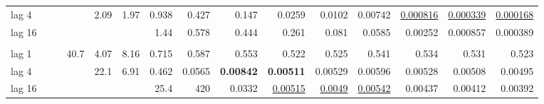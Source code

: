 \begin{table}[t]
\begin{tabular}{lrrrrrrrrrrrrrr}
\quad lag 4 &  &  &  & 2.09 & 1.97 & 0.938 & 0.427 & 0.147 & 0.0259 & 0.0102 & 0.00742 & \underline{0.000816} & \underline{0.000339} & \underline{0.000168} \\
\quad lag 16 &  &  &  &  &  & 1.44 & 0.578 & 0.444 & 0.261 & 0.081 & 0.0585 & 0.00252 & 0.000857 & 0.000389 \\
\addlinespace
\multicolumn{15}{l}{\textit{VARX}} \\
\quad lag 1 &  &  & 40.7 & 4.07 & 8.16 & 0.715 & 0.587 & 0.553 & 0.522 & 0.525 & 0.541 & 0.534 & 0.531 & 0.523 \\
\quad lag 4 &  &  &  & 22.1 & 6.91 & 0.462 & 0.0565 & \textbf{0.00842} & \textbf{0.00511} & 0.00529 & 0.00596 & 0.00528 & 0.00508 & 0.00495 \\
\quad lag 16 &  &  &  &  &  & 25.4 & 420 & 0.0332 & \underline{0.00515} & \underline{0.0049} & \underline{0.00542} & 0.00437 & 0.00412 & 0.00392 \\
\bottomrule
\end{tabular}
\end{table}